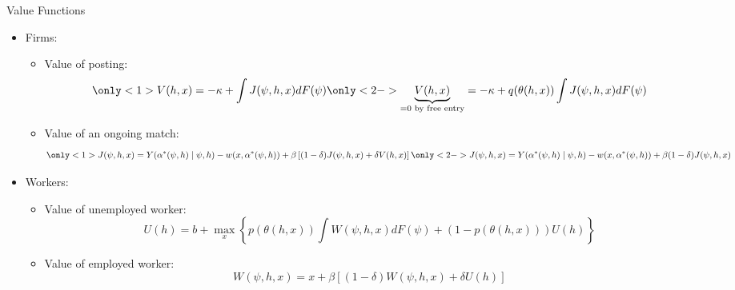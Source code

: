 \documentclass[aspectratio=1610]{beamer}
\begin{document}
\begin{frame}{Value Functions}

    \begin{itemize}
        \item Firms:
        \begin{itemize}
            \item<1-> Value of posting:
                \begin{equation*}
                \only< 1>{
 V(h, x) = - \kappa + \int J(\psi, h, x) dF(\psi)\vphantom{\underbrace{V(h, x)}_{=0\text{ by free entry}} = - \kappa + q(\theta(h,x)) \int J(\psi, h, x) dF(\psi)}
 }
                \only<2 ->{
                    \underbrace{V(h, x)}_{=0\text{ by free entry}} = - \kappa + q(\theta(h,x))\int J(\psi, h, x) dF(\psi)
 }
                \end{equation*}
            \item Value of an ongoing match:
            \begin{equation*}
                \only<1>{
 J(\psi, h, x) = Y(\alpha^*(\psi, h)\mid \psi, h) - w(x, \alpha^*(\psi, h)) + \beta \left[(1 - \delta) J(\psi, h, x) + \delta V(h, x) \right] \vphantom{J(\psi, h, x) = Y(\alpha^*(\psi, h)\mid \psi, h) - w(x, \alpha^*(\psi, h)) + \beta (1 - \delta) J(\psi, h, x)}
 }
                \only<2 -> {
 J(\psi, h, x) = Y(\alpha^*(\psi, h)\mid \psi, h) - w(x, \alpha^*(\psi, h)) + \beta (1 - \delta) J(\psi, h, x)
 }
                \end{equation*}
        \end{itemize}
        \item<3-> Workers:
        \begin{itemize}
            \item Value of unemployed worker:
            \begin{equation*}
 U(h) = b + \max_{x}\left\{ p(\theta(h,x))\int W(\psi, h, x) dF(\psi) + (1 - p(\theta(h,x)))U(h)\right\}
            \end{equation*}
            \item Value of employed worker:
            \begin{equation*}
 W(\psi, h, x) = x + \beta \left[ (1 - \delta) W(\psi, h, x) + \delta U(h) \right]
            \end{equation*}
        \end{itemize}
    \end{itemize}
    
\end{frame}
\end{document}
